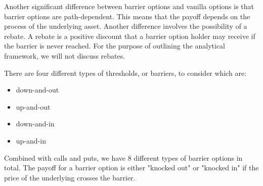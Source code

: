 Another significant difference between barrier options and vanilla options is that barrier options are path-dependent. This means that the payoff depends on the process of the underlying asset. Another difference involves the possibility of a rebate. A rebate is a positive discount that a barrier option holder may receive if the barrier is never reached. For the purpose of outlining the analytical framework, we will not discuss rebates.

There are four different types of thresholds, or barriers, to consider which are:

\begin{itemize}
	\item down-and-out
	\item up-and-out
	\item down-and-in
	\item up-and-in
\end{itemize}

Combined with calls and puts, we have 8 different types of barrier options in total. The payoff for a barrier option is either "knocked out" or "knocked in" if the price of the underlying crosses the barrier. 

